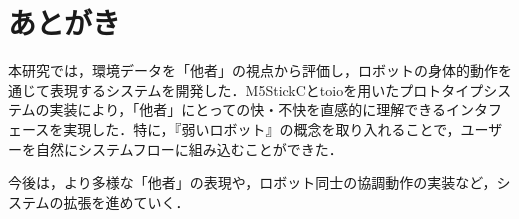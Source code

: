 \documentclass[paper=a4paper,jafontsize=9pt,head_space=15mm,gutter=20mm,
twocolumn,number_of_lines=49, line_length=26zw]{myuarticle}
\begin{document}
\section{あとがき}
本研究では，環境データを「他者」の視点から評価し，ロボットの身体的動作を通じて表現するシステムを開発した．M5StickCとtoioを用いたプロトタイプシステムの実装により，「他者」にとっての快・不快を直感的に理解できるインタフェースを実現した．特に，『弱いロボット』の概念を取り入れることで，ユーザーを自然にシステムフローに組み込むことができた．

今後は，より多様な「他者」の表現や，ロボット同士の協調動作の実装など，システムの拡張を進めていく．

\renewcommand{\refname}{　参考文献}


\end{document}
